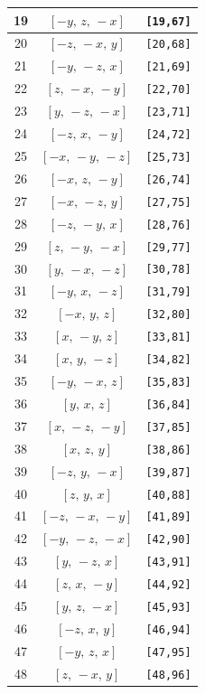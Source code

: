 \documentclass[fleqn,8pt]{jsarticle}
\begin{document}
\begin{longtable}{ccc}
19 & $\left[ - y,\, z,\, - x \right]$ & {\tt [19,67]} \\ \hline
20 & $\left[ - z,\, - x,\, y \right]$ & {\tt [20,68]} \\ \hline
21 & $\left[ - y,\, - z,\, x \right]$ & {\tt [21,69]} \\ \hline
22 & $\left[ z,\, - x,\, - y \right]$ & {\tt [22,70]} \\ \hline
23 & $\left[ y,\, - z,\, - x \right]$ & {\tt [23,71]} \\ \hline
24 & $\left[ - z,\, x,\, - y \right]$ & {\tt [24,72]} \\ \hline
25 & $\left[ - x,\, - y,\, - z \right]$ & {\tt [25,73]} \\ \hline
26 & $\left[ - x,\, z,\, - y \right]$ & {\tt [26,74]} \\ \hline
27 & $\left[ - x,\, - z,\, y \right]$ & {\tt [27,75]} \\ \hline
28 & $\left[ - z,\, - y,\, x \right]$ & {\tt [28,76]} \\ \hline
29 & $\left[ z,\, - y,\, - x \right]$ & {\tt [29,77]} \\ \hline
30 & $\left[ y,\, - x,\, - z \right]$ & {\tt [30,78]} \\ \hline
31 & $\left[ - y,\, x,\, - z \right]$ & {\tt [31,79]} \\ \hline
32 & $\left[ - x,\, y,\, z \right]$ & {\tt [32,80]} \\ \hline
33 & $\left[ x,\, - y,\, z \right]$ & {\tt [33,81]} \\ \hline
34 & $\left[ x,\, y,\, - z \right]$ & {\tt [34,82]} \\ \hline
35 & $\left[ - y,\, - x,\, z \right]$ & {\tt [35,83]} \\ \hline
36 & $\left[ y,\, x,\, z \right]$ & {\tt [36,84]} \\ \hline
37 & $\left[ x,\, - z,\, - y \right]$ & {\tt [37,85]} \\ \hline
38 & $\left[ x,\, z,\, y \right]$ & {\tt [38,86]} \\ \hline
39 & $\left[ - z,\, y,\, - x \right]$ & {\tt [39,87]} \\ \hline
40 & $\left[ z,\, y,\, x \right]$ & {\tt [40,88]} \\ \hline
41 & $\left[ - z,\, - x,\, - y \right]$ & {\tt [41,89]} \\ \hline
42 & $\left[ - y,\, - z,\, - x \right]$ & {\tt [42,90]} \\ \hline
43 & $\left[ y,\, - z,\, x \right]$ & {\tt [43,91]} \\ \hline
44 & $\left[ z,\, x,\, - y \right]$ & {\tt [44,92]} \\ \hline
45 & $\left[ y,\, z,\, - x \right]$ & {\tt [45,93]} \\ \hline
46 & $\left[ - z,\, x,\, y \right]$ & {\tt [46,94]} \\ \hline
47 & $\left[ - y,\, z,\, x \right]$ & {\tt [47,95]} \\ \hline
48 & $\left[ z,\, - x,\, y \right]$ & {\tt [48,96]} \\
\end{longtable}
\end{document}
